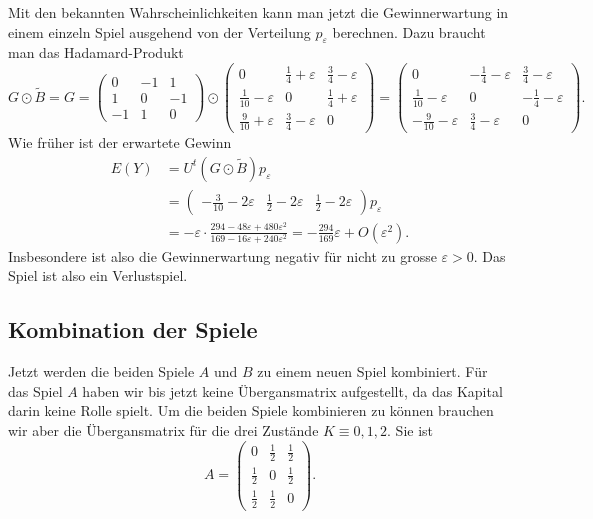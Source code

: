 Mit den bekannten Wahrscheinlichkeiten kann man jetzt die
Gewinnerwartung in einem einzeln Spiel ausgehend von der Verteilung
$p_{\varepsilon}$ berechnen.
Dazu braucht man das Hadamard-Produkt
\[
G\odot \tilde{B}
=
G=\begin{pmatrix}
 0&-1& 1\\
 1& 0&-1\\
-1& 1& 0
\end{pmatrix}
\odot
\begin{pmatrix}
0                        &\frac14+\varepsilon & \frac34-\varepsilon \\
\frac{1}{10}-\varepsilon & 0                  & \frac14+\varepsilon \\
\frac{9}{10}+\varepsilon &\frac34-\varepsilon & 0
\end{pmatrix}
=
\begin{pmatrix}
 0                        &-\frac14-\varepsilon & \frac34-\varepsilon \\
 \frac{1}{10}-\varepsilon & 0                   &-\frac14-\varepsilon \\
-\frac{9}{10}-\varepsilon & \frac34-\varepsilon & 0
\end{pmatrix}.
\]
Wie früher ist der erwartete Gewinn
\begin{align*}
E(Y)
&=
U^t (G\odot \tilde{B}) p_{\varepsilon}
\\
&=
\begin{pmatrix}
-\frac{3}{10}-2\varepsilon & \frac12-2\varepsilon & \frac12-2\varepsilon
\end{pmatrix}
p_{\varepsilon}
\\
&=
-
\varepsilon\cdot
\frac{
294-48\varepsilon+480\varepsilon^2
}{
169-16\varepsilon+240\varepsilon^2
}
=
-\frac{294}{169}\varepsilon + O(\varepsilon^2).
\end{align*}
Insbesondere ist also die Gewinnerwartung negativ für nicht zu grosse 
$\varepsilon>0$.
Das Spiel ist also ein Verlustspiel.

%
%
\subsection{Kombination der Spiele
\label{buch:subsection:kombination}}
Jetzt werden die beiden Spiele $A$ und $B$ zu einem neuen
Spiel kombiniert.
Für das Spiel $A$ haben wir bis jetzt keine Übergansmatrix aufgestellt,
da das Kapital darin keine Rolle spielt.
Um die beiden Spiele kombinieren zu können brauchen wir aber die Übergansmatrix
für die drei Zustände $K\equiv 0,1,2$.
Sie ist
\[
A=\begin{pmatrix}
0&\frac12&\frac12\\
\frac12&0&\frac12\\
\frac12&\frac12&0
\end{pmatrix}.
\]

